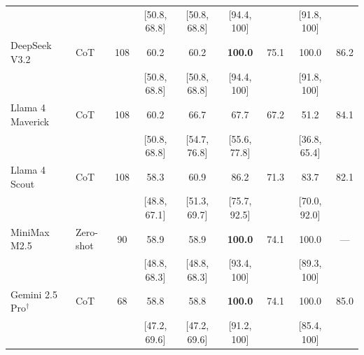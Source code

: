 \documentclass[11pt]{article}
\begin{document}
\begin{table}[t]
\begin{tabular}{llccccccc}
 & & & \scriptsize{[50.8, 68.8]} & \scriptsize{[50.8, 68.8]} & \scriptsize{[94.4, 100]} & & \scriptsize{[91.8, 100]} & \\
DeepSeek V3.2 & CoT & 108 & 60.2 & 60.2 & \textbf{100.0} & 75.1 & 100.0 & 86.2 \\
 & & & \scriptsize{[50.8, 68.8]} & \scriptsize{[50.8, 68.8]} & \scriptsize{[94.4, 100]} & & \scriptsize{[91.8, 100]} & \\
Llama 4 Maverick & CoT & 108 & 60.2 & 66.7 & 67.7 & 67.2 & 51.2 & 84.1 \\
 & & & \scriptsize{[50.8, 68.8]} & \scriptsize{[54.7, 76.8]} & \scriptsize{[55.6, 77.8]} & & \scriptsize{[36.8, 65.4]} & \\
Llama 4 Scout & CoT & 108 & 58.3 & 60.9 & 86.2 & 71.3 & 83.7 & 82.1 \\
 & & & \scriptsize{[48.8, 67.1]} & \scriptsize{[51.3, 69.7]} & \scriptsize{[75.7, 92.5]} & & \scriptsize{[70.0, 92.0]} & \\
MiniMax M2.5 & Zero-shot & 90 & 58.9 & 58.9 & \textbf{100.0} & 74.1 & 100.0 & --- \\
 & & & \scriptsize{[48.8, 68.3]} & \scriptsize{[48.8, 68.3]} & \scriptsize{[93.4, 100]} & & \scriptsize{[89.3, 100]} & \\
Gemini 2.5 Pro$^\dagger$ & CoT & 68 & 58.8 & 58.8 & \textbf{100.0} & 74.1 & 100.0 & 85.0 \\
 & & & \scriptsize{[47.2, 69.6]} & \scriptsize{[47.2, 69.6]} & \scriptsize{[91.2, 100]} & & \scriptsize{[85.4, 100]} & \\
\bottomrule
\end{tabular}
\end{table}
\end{document}

